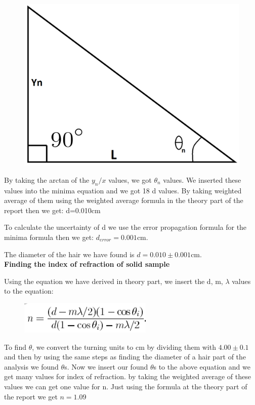 \documentclass[11pt,a4paper]{article}
\begin{document}
{\begin{figure}[H]
\begin{center}
		\includegraphics[scale=0.2]{tr.png}
	\end{center}
\end{figure}
\par By taking the arctan of the $y_n/x$ values, we got $\theta_n$ values. We inserted these values into the minima equation and we got 18 d values. By taking weighted average of them using the weighted average formula in the theory part of the report then we get: d=0.010cm
\par To calculate the uncertainty of d we use the error propagation formula for the minima formula then we get: $d_{error}=0.001$cm.
\par The diameter of the hair we have found is $d=0.010\pm0.001$cm.
\\[\baselineskip]
\textbf{\small{Finding the index of refraction of solid sample}}\\[\baselineskip]
\par Using the equation we have derived in theory part, we insert the d, m, $\lambda$ values to the equation:
\begin{figure}[H]
	\begin{center}
		\includegraphics[scale=0.8]{in.png}
	\end{center}
\end{figure}
\par To find $\theta$, we convert the turning units to cm by dividing them with $4.00\pm0.1$ and then by using the same steps as finding the diameter of a hair part of the analysis we found $\theta$s. Now we insert our found $\theta$s to the above equation and we get many values for index of refraction. by taking the weighted average of these values we can get one value for n. Just using the formula at the theory part of the report we get $n=1.09$
}
\end{document}
